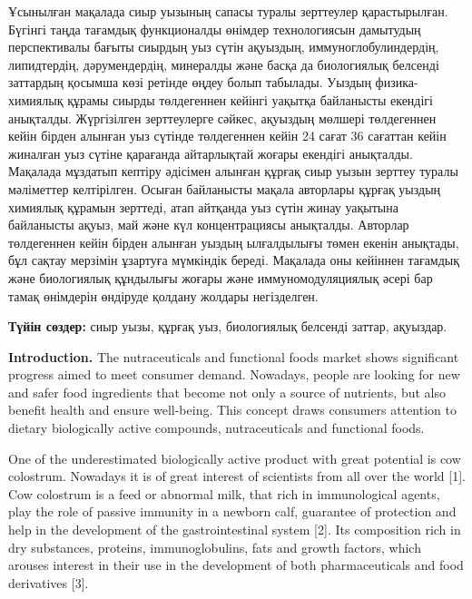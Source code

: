 Ұсынылған мақалада сиыр уызының сапасы туралы зерттеулер қарастырылған.
Бүгінгі таңда тағамдық функционалды өнімдер технологиясын дамытудың
перспективалы бағыты сиырдың уыз сүтін ақуыздың, иммуноглобулиндердің,
липидтердің, дәрумендердің, минералды және басқа да биологиялық белсенді
заттардың қосымша көзі ретінде өңдеу болып табылады. Уыздың
физика-химиялық құрамы сиырды төлдегеннен кейінгі уақытқа байланысты
екендігі анықталды. Жүргізілген зерттеулерге сәйкес, ақуыздың мөлшері
төлдегеннен кейін бірден алынған уыз сүтінде төлдегеннен кейін 24 сағат
36 сағаттан кейін жиналған уыз сүтіне қарағанда айтарлықтай жоғары
екендігі анықталды. Мақалада мұздатып кептіру әдісімен алынған құрғақ
сиыр уызын зерттеу туралы мәліметтер келтірілген. Осыған байланысты
мақала авторлары құрғақ уыздың химиялық құрамын зерттеді, атап айтқанда
уыз сүтін жинау уақытына байланысты ақуыз, май және күл концентрациясы
анықталды. Авторлар төлдегеннен кейін бірден алынған уыздың ылғалдылығы
төмен екенін анықтады, бұл сақтау мерзімін ұзартуға мүмкіндік береді.
Мақалада оны кейіннен тағамдық және биологиялық құндылығы жоғары және
иммуномодуляциялық әсері бар тамақ өнімдерін өндіруде қолдану жолдары
негізделген.

{\bfseries Түйін сөздер:} сиыр уызы, құрғақ уыз, биологиялық белсенді
заттар, ақуыздар.

{\bfseries Introduction.} The nutraceuticals and functional foods market
shows significant progress aimed to meet consumer demand. Nowadays,
people are looking for new and safer food ingredients that become not
only a source of nutrients, but also benefit health and ensure
well-being. This concept draws consumers\textquotesingle{} attention to
dietary biologically active compounds, nutraceuticals and functional
foods.

One of the underestimated biologically active product with great
potential is cow colostrum. Nowadays it is of great interest of
scientists from all over the world {[}1{]}. Cow colostrum is a feed or
abnormal milk, that rich in immunological agents, play the role of
passive immunity in a newborn calf, guarantee of protection and help in
the development of the gastrointestinal system {[}2{]}. Its composition
rich in dry substances, proteins, immunoglobulins, fats and growth
factors, which arouses interest in their use in the development of both
pharmaceuticals and food derivatives {[}3{]}.

